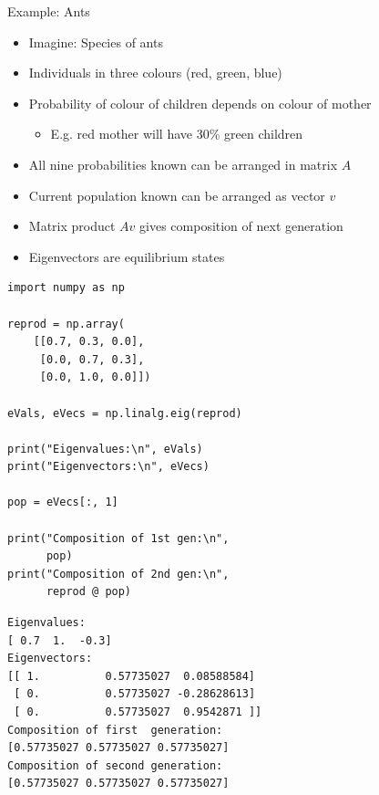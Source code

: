 
\begin{frame}{Example: Ants}
%
\begin{itemize}
\item Imagine: Species of ants
\item Individuals in three colours (red, green, blue)
\item Probability of colour of children depends on colour of mother
	\begin{itemize}
	\item E.\;g. red mother will have 30\% green children
	\end{itemize}
\item All nine probabilities known \Thus can be arranged in matrix $A$
\item Current population known \Thus can be arranged as vector $v$
\item[\Thus] Matrix product $Av$ gives composition of next generation
\item[\Thus] Eigenvectors are equilibrium states
\end{itemize}
%
\end{frame}


\begin{frame}[fragile]
%
\begin{tcbraster}[raster columns=2,
                  raster equal height,
                  nobeforeafter,
                  raster column skip=0.2cm]
\begin{codebox}
\begin{verbatim}
import numpy as np

reprod = np.array(
    [[0.7, 0.3, 0.0],
     [0.0, 0.7, 0.3],
     [0.0, 1.0, 0.0]])

eVals, eVecs = np.linalg.eig(reprod)

print("Eigenvalues:\n", eVals)
print("Eigenvectors:\n", eVecs)

pop = eVecs[:, 1]

print("Composition of 1st gen:\n",
      pop)
print("Composition of 2nd gen:\n",
      reprod @ pop)
\end{verbatim}
\end{codebox}
%
\begin{cmdbox}
\begin{verbatim}
Eigenvalues:
[ 0.7  1.  -0.3]
Eigenvectors:
[[ 1.          0.57735027  0.08588584]
 [ 0.          0.57735027 -0.28628613]
 [ 0.          0.57735027  0.9542871 ]]
Composition of first  generation:
[0.57735027 0.57735027 0.57735027]
Composition of second generation:
[0.57735027 0.57735027 0.57735027]
\end{verbatim}
\end{cmdbox}
\end{tcbraster}
%
\end{frame}


